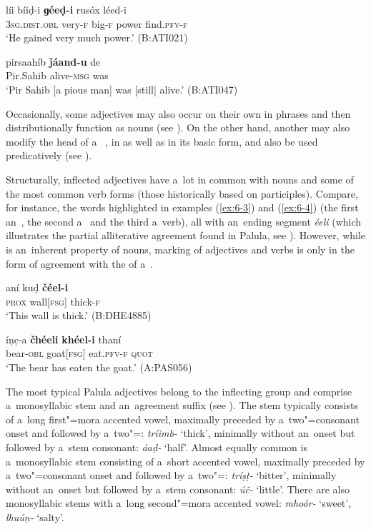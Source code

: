 \begin{exe}
\ex
\label{ex:6-1}
\gll líi bíiḍ-i \textbf{ɡéeḍ-i} rusóx léed-i \\
\textsc{3sg.dist.obl} very-\textsc{f} big-\textsc{f} power find.\textsc{pfv-f} \\
\glt `He gained very much power.' (B:ATI021)

\ex
\label{ex:6-2}
\gll pirsaahíb \textbf{ǰáand-u} de \\
Pir.Sahib alive-\textsc{msg} was  \\
\glt `Pir Sahib [a pious man] was [still] alive.' (B:ATI047)
\end{exe}

Occasionally, some adjectives may also occur on their own in  phrases and then distributionally function as nouns (see ). On the other hand, another  may also modify the head  of a~ , in  as well as in its basic form, and also be used predicatively (see ).


Structurally, inflected adjectives have a~lot in common with nouns and some of the most common  verb forms (those historically based on participles). Compare, for instance, the words highlighted in examples (\ref{ex:6-3}) and (\ref{ex:6-4}) (the first an~, the second a~ and the third a~verb), all with an~ending segment \textit{éeli} (which illustrates the partial alliterative agreement found in Palula, see \citealt[87--88]{corbett2006}). However, while  is an~inherent property of nouns,  marking of adjectives and verbs is only in the form of agreement with the  of a~. 


\begin{exe}
\ex
\label{ex:6-3}
\gll aní kuḍ \textbf{čéel-i} \\
\textsc{prox} wall[\textsc{fsg}] thick-\textsc{f} \\
\glt `This wall is thick.' (B:DHE4885)

\ex
\label{ex:6-4}
\gll íṇc̣-a \textbf{čhéeli} \textbf{khéel-i} thaní \\
bear-\textsc{obl} goat[\textsc{fsg}] eat.\textsc{pfv-f} \textsc{quot} \\
\glt `The bear has eaten the goat.' (A:PAS056)
\end{exe}


The most typical Palula adjectives belong to the inflecting group and comprise a~monosyllabic stem and an~agreement suffix (see ). The stem typically consists of a~long first"=mora accented vowel, maximally preceded by a~two"=consonant onset and followed by a~two"=: \textit{tríimb-} `thick', minimally without an~onset but followed by a~stem consonant: \textit{áaḍ-} `half'. Almost equally common is a~monosyllabic stem consisting of a~short accented vowel, maximally preceded by a~two"=consonant onset and followed by a~two"=: \textit{tríṣṭ-} `bitter', minimally without an~onset but followed by a~stem consonant: \textit{úč-} `little'. There are also monosyllabic stems with a~long second"=mora accented vowel: \textit{mhoór-} `sweet', \textit{lhuúṇ-} `salty'. 


